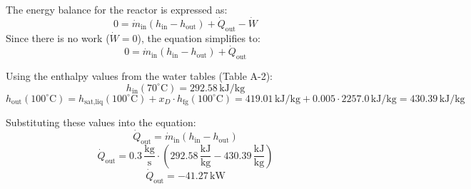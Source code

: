 The energy balance for the reactor is expressed as:  
\[
0 = \dot{m}_{\text{in}} \left( h_{\text{in}} - h_{\text{out}} \right) + \dot{Q}_{\text{out}} - \dot{W}
\]  
Since there is no work (\( \dot{W} = 0 \)), the equation simplifies to:  
\[
0 = \dot{m}_{\text{in}} \left( h_{\text{in}} - h_{\text{out}} \right) + \dot{Q}_{\text{out}}
\]  

Using the enthalpy values from the water tables (Table A-2):  
\[
h_{\text{in}}(70^\circ\text{C}) = 292.58 \, \text{kJ/kg}
\]  
\[
h_{\text{out}}(100^\circ\text{C}) = h_{\text{sat,liq}}(100^\circ\text{C}) + x_D \cdot h_{\text{fg}}(100^\circ\text{C}) = 419.01 \, \text{kJ/kg} + 0.005 \cdot 2257.0 \, \text{kJ/kg} = 430.39 \, \text{kJ/kg}
\]  

Substituting these values into the equation:  
\[
\dot{Q}_{\text{out}} = \dot{m}_{\text{in}} \left( h_{\text{in}} - h_{\text{out}} \right)
\]  
\[
\dot{Q}_{\text{out}} = 0.3 \, \frac{\text{kg}}{\text{s}} \cdot \left( 292.58 \, \frac{\text{kJ}}{\text{kg}} - 430.39 \, \frac{\text{kJ}}{\text{kg}} \right)
\]  
\[
\dot{Q}_{\text{out}} = -41.27 \, \text{kW}
\]